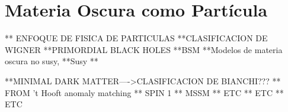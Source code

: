 \chapter{Materia Oscura como Partícula}
** ENFOQUE DE FISICA DE PARTICULAS
**CLASIFICACION DE WIGNER
**PRIMORDIAL BLACK HOLES
**BSM
**Modelos de materia oscura no susy,
**Susy
**


**MINIMAL DARK MATTER---->CLASIFICACION DE BIANCHI???
** FROM 't Hooft anomaly matching
** SPIN 1
** MSSM
** ETC 
** ETC 
** ETC

